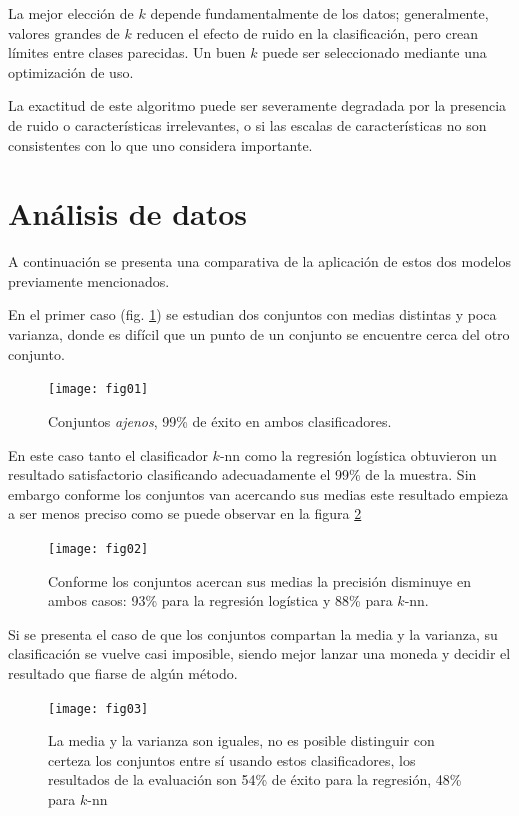 \documentclass[11pt,letterpaper, reqno]{article}
\begin{document}
La mejor elección de $ k $ depende fundamentalmente de los datos; generalmente, valores grandes de $ k $ reducen el efecto de ruido en la clasificación, pero crean límites entre clases parecidas. Un buen $ k $ puede ser seleccionado mediante una optimización de uso.

La exactitud de este algoritmo puede ser severamente degradada por la presencia de ruido o características irrelevantes, o si las escalas de características no son consistentes con lo que uno considera importante.

\section{Análisis de datos}

A continuación se presenta una comparativa de la aplicación de estos dos modelos previamente mencionados.

En el primer caso (fig. \ref{fig:fig01}) se estudian dos conjuntos con medias distintas y poca varianza, donde es difícil que un punto de un conjunto se encuentre cerca del otro conjunto.

\begin{figure}
	\label{fig:fig01}
	\begin{center}
		\texttt{[image: fig01]}
	\end{center}
	\caption{Conjuntos \textit{ajenos}, 99\% de éxito en ambos clasificadores.}
\end{figure}

En este caso tanto el clasificador $k$-nn como la regresión logística obtuvieron un resultado satisfactorio clasificando adecuadamente el 99\% de la muestra. Sin embargo conforme los conjuntos van acercando sus medias este resultado empieza a ser menos preciso como se puede observar en la figura \ref{fig:fig02}

\begin{figure}
	\label{fig:fig02}
	\begin{center}
		\texttt{[image: fig02]}
	\end{center}
	\caption{Conforme los conjuntos acercan sus medias la precisión disminuye en ambos casos: 93\% para la regresión logística y 88\% para $k$-nn.}
\end{figure}

Si se presenta el caso de que los conjuntos compartan la media y la varianza, su clasificación se vuelve casi imposible, siendo mejor lanzar una moneda y decidir el resultado que fiarse de algún método.

\begin{figure}
	\label{fig:fig03}
	\begin{center}
		\texttt{[image: fig03]}
	\end{center}
	\caption{La media y la varianza son iguales, no es posible distinguir con certeza los conjuntos entre sí usando estos clasificadores, los resultados de la evaluación son 54\% de éxito para la regresión, 48\% para $k$-nn}
\end{figure}
\end{document}
